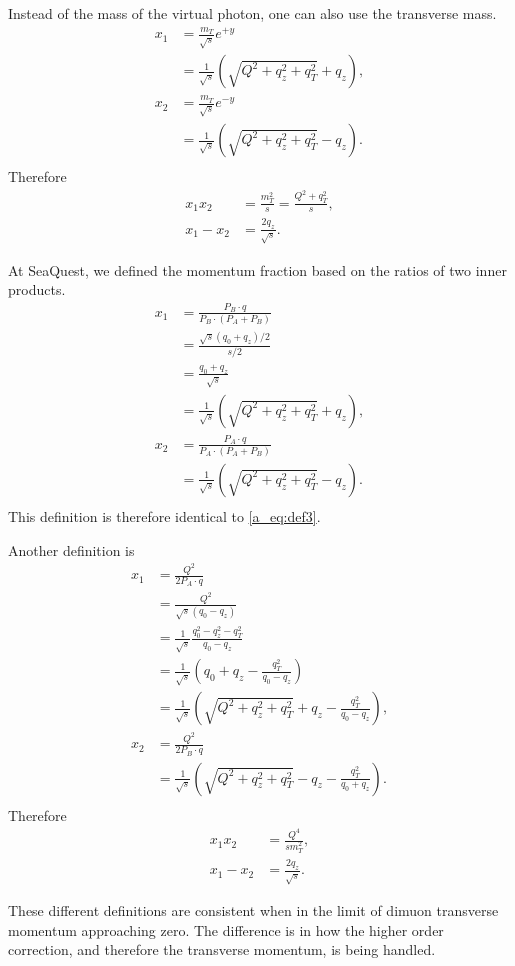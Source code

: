 \documentclass[../main.tex]{subfiles}
\begin{document}
Instead of the mass of the virtual photon, one can also use the transverse mass.
\begin{equation}
	\begin{split}
		x_1 &= \frac{m_T}{\sqrt{s}} e^{+y}\\
		&=\frac{1}{\sqrt{s}}\left(\sqrt{Q^2+q_z^2+q_T^2}+q_z\right),\\
		x_2 &= \frac{m_T}{\sqrt{s}} e^{-y}\\
		&= \frac{1}{\sqrt{s}}\left(\sqrt{Q^2+q_z^2+q_T^2}-q_z\right).\\
	\end{split}
	\label{a_eq:def3}
\end{equation}
Therefore
\begin{equation}
	\begin{split}
		x_1x_2 &= \frac{m_T^2}{s} = \frac{Q^2+q_T^2}{s},\\
		x_1-x_2 &= \frac{2q_z}{\sqrt{s}}.
	\end{split}
\end{equation}


At SeaQuest, we defined the momentum fraction based on the ratios of two inner products.
\begin{equation}
	\begin{split}
		x_1 &= \frac{P_B\cdot q}{P_B\cdot (P_A+P_B)}\\
		&= \frac{\sqrt{s}(q_0+q_z)/2}{s/2}\\
		&= \frac{q_0+q_z}{\sqrt{s}}\\
		&= \frac{1}{\sqrt{s}}\left(\sqrt{Q^2+q_z^2+q_T^2}+q_z\right),\\
		x_2 &= \frac{P_A\cdot q}{P_A\cdot (P_A+P_B)}\\
		&= \frac{1}{\sqrt{s}}\left(\sqrt{Q^2+q_z^2+q_T^2}-q_z\right).\\
	\end{split}
\end{equation}
This definition is therefore identical to \cref{a_eq:def3}.

Another definition is
\begin{equation}
	\begin{split}
		x_1 &= \frac{Q^2}{2P_A \cdot q}\\
		&= \frac{Q^2}{\sqrt{s}(q_0-q_z)}\\
		&= \frac{1}{\sqrt{s}}\frac{q_0^2 -q_z^2 -q_T^2}{q_0-q_z} \\
		&= \frac{1}{\sqrt{s}} \left(q_0+q_z -\frac{q_T^2}{q_0-q_z}\right)\\
		&= \frac{1}{\sqrt{s}}\left(\sqrt{Q^2+q_z^2+q_T^2}+q_z -\frac{q_T^2}{q_0-q_z}\right),\\
		x_2 &= \frac{Q^2}{2P_B \cdot q}\\
		&= \frac{1}{\sqrt{s}}\left(\sqrt{Q^2+q_z^2+q_T^2}-q_z -\frac{q_T^2}{q_0+q_z}\right).\\
	\end{split}
\end{equation}
Therefore
\begin{equation}
	\begin{split}
		x_1x_2 &= \frac{Q^4}{s m_T^2}, \\
		x_1-x_2 &= \frac{2q_z}{\sqrt{s}}.
	\end{split}
\end{equation}

These different definitions are consistent when in the limit of dimuon transverse momentum approaching zero.
The difference is in how the higher order correction, and therefore the transverse momentum,
is being handled.
\end{document}

